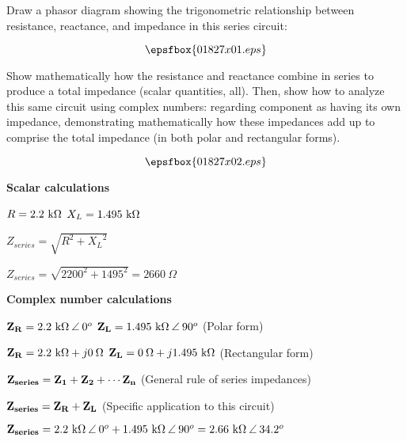

Draw a phasor diagram showing the trigonometric relationship between resistance, reactance, and impedance in this series circuit:

$$\epsfbox{01827x01.eps}$$

Show mathematically how the resistance and reactance combine in series to produce a total impedance (scalar quantities, all).  Then, show how to analyze this same circuit using complex numbers: regarding component as having its own impedance, demonstrating mathematically how these impedances add up to comprise the total impedance (in both polar and rectangular forms).







$$\epsfbox{01827x02.eps}$$

\goodbreak

\noindent
{\bf Scalar calculations}

$R = 2.2 \hbox{ k}\Omega$ \hskip 20pt $X_L = 1.495 \hbox{ k}\Omega$

$Z_{series} = \sqrt{R^2 + {X_L}^2}$

$Z_{series} = \sqrt{2200^2 + 1495^2} = 2660 \> \Omega$

\vskip 10pt

\goodbreak

\noindent
{\bf Complex number calculations}

${\bf Z_R} = 2.2 \hbox{ k}\Omega \> \angle \> 0^o$ \hskip 20pt ${\bf Z_L} = 1.495 \hbox{ k}\Omega \> \angle \> 90^o$ \hskip 10pt (Polar form)

${\bf Z_R} = 2.2 \hbox{ k}\Omega + j0 \> \Omega$ \hskip 20pt ${\bf Z_L} = 0 \> \Omega + j1.495 \hbox{ k}\Omega$ \hskip 10pt (Rectangular form)

\vskip 5pt

${\bf Z_{series}} = {\bf Z_1} + {\bf Z_2} + \cdots {\bf Z_n}$ \hskip 10pt (General rule of series impedances)

${\bf Z_{series}} = {\bf Z_R} + {\bf Z_L}$ \hskip 10pt (Specific application to this circuit)

\vskip 5pt

${\bf Z_{series}} = 2.2 \hbox{ k}\Omega \> \angle \> 0^o + 1.495 \hbox{ k}\Omega \> \angle \> 90^o = 2.66 \hbox{ k}\Omega \> \angle \> 34.2^o$ 

